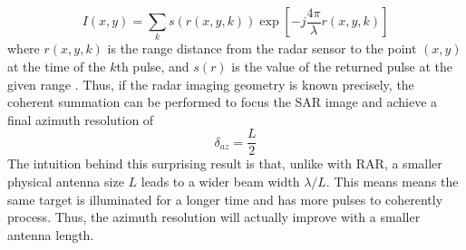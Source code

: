 \begin{equation}
	I(x, y) = \sum_{k} s(r(x, y, k)) \exp[-j \frac{4 \pi}{\lambda} r(x, y, k)]
\end{equation}
where $r(x, y, k)$ is the range distance from the radar sensor to the point $ (x, y) $ at the time of the $k$th pulse, and $s(r)$ is the value of the returned pulse at the given range \citep{Zebker2018InsarMissionLevel}.
Thus, if the radar imaging geometry is known precisely, the coherent summation can be performed to focus the SAR image and achieve a final azimuth resolution of
\begin{equation}
	\delta_{az} = \frac{L}{2}
\end{equation}
The intuition behind this surprising result is that, unlike with RAR, a smaller physical antenna size $L$ leads to a wider beam width $\lambda / L$. This means means the same target is illuminated for a longer time and has more pulses to coherently process. Thus, the azimuth resolution will actually improve with a smaller antenna length.

